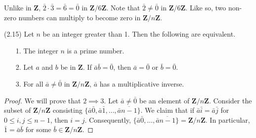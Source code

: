 \vspace{2ex}
\begin{rmk}
Unlike in ${\bm Z}$, $\bar{2}\cdot \bar{3}=\bar{6}=\bar{0}$ in ${\bm Z}/6{\bm Z}$. Note that $\bar{2}\ne \bar{0}$ in ${\bm Z}/6{\bm Z}$. Like so, two non-zero numbers can multiply to become zero in ${\bm Z}/n{\bm Z}$. 
\end{rmk}
\vspace{2ex}
\begin{thm}
(2.15) Let $n$ be an integer greater than 1. Then the following are equivalent.
\begin{itemize}
	\item[1.] The integer $n$ is a prime number.
	\item[2.] Let $a$ and $b$ be in ${\bm Z}$. If $\bar{a}\bar{b}=\bar{0}$, then $\bar{a}=\bar{0}$ or $\bar{b}=\bar{0}$.
	\item[3.] For all $\bar{a}\ne \bar{0}$ in ${\bm Z}/n{\bm Z}$, $\bar{a}$ has a multiplicative inverse.
\end{itemize}
\end{thm}
\vspace{2ex}
\begin{proof}
We will prove that $2\implies 3$. Let $\bar{a}\ne \bar{0}$ be an element of ${\bm Z}/n{\bm Z}$. Consider the subset of ${\bm Z}/n{\bm Z}$ consisting $\{\bar{a}\bar{0},\bar{a}\bar{1},\ldots ,\bar{a}\overline{n-1}\}$. We claim that if $\bar{a}\bar{i}=\bar{a}\bar{j}$ for $0\leq i,j\leq n-1$, then $i=j$. Consequently, $\{\bar{a}\bar{0},\ldots ,\bar{a}\overline{n-1}\}={\bm Z}/n{\bm Z}$. In particular, $\bar{1}=\bar{a}\bar{b}$ for some $\bar{b}\in {\bm Z}/n{\bm Z}$.
\end{proof}
\vspace{2ex}

